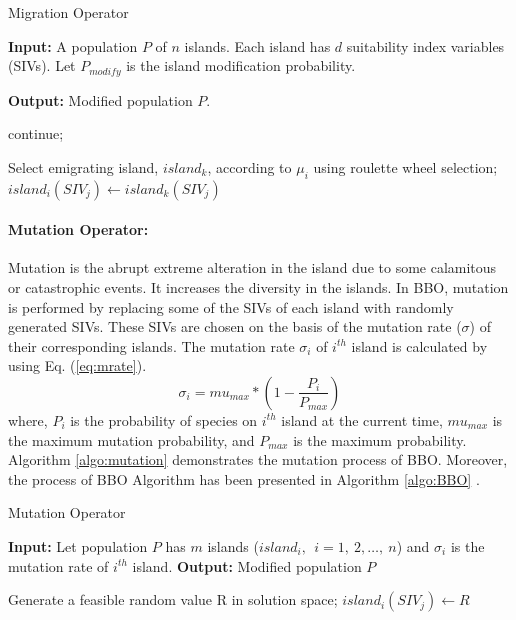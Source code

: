 \begin{algorithm}
\footnotesize
\caption{\fontsize{10pt}{12pt}\selectfont Migration Operator  \cite{ma2010}}
\label{algo:migration}
\begin{algorithmic}
\STATE \textbf{Input:}  A population $P$ of $n$ islands. Each island has $d$ suitability index variables (SIVs).
\STATE Let $P_{modify}$ is the island modification probability.

\STATE \textbf{Output:}  Modified population $P$.

    \STATE    continue;
  \ENDIF


        \STATE Select emigrating island, $island_k$, according to $\mu_i$ using roulette wheel selection;
           \STATE  $island_i(SIV_j) \leftarrow island_k(SIV_j)$
         
    \ENDIF
\ENDFOR
\ENDFOR
\end{algorithmic}
\end{algorithm}

\paragraph{Mutation Operator:} Mutation is the abrupt extreme alteration in the island due to some calamitous or catastrophic events. It increases the diversity in the islands. In BBO, mutation is performed by replacing some of the SIVs of each island with randomly generated SIVs. These SIVs are chosen on the basis of the mutation rate ($\sigma$) of their corresponding islands. The mutation rate $\sigma_i$ of $i^{th}$ island is calculated by using Eq. (\ref{eq:mrate}).
\begin{equation}\label{eq:mrate}
\sigma_i=mu_{max}*(1-\frac{P_i}{P_{max}} )
\end{equation}
where, ${P_i}$  is the probability of species on $i^{th}$ island at the current time, $mu_{max}$ is the maximum mutation probability, and $P_{max}$  is the maximum probability.  Algorithm \ref{algo:mutation} \cite{ma2010} demonstrates the mutation process of BBO. Moreover, the process of BBO Algorithm has been presented in Algorithm \ref{algo:BBO} \cite{ma2010}.

\begin{algorithm}
\caption{\fontsize{10}{12} \selectfont Mutation Operator \cite{ma2010}}
\label{algo:mutation}
\footnotesize

\begin{algorithmic}
\STATE \textbf{Input:} Let population $P$ has $m$ islands ($island_i,\ \ i=1,\ 2,\dots, \ n$) and $\sigma_i$ is the mutation rate of $i^{th}$ island.
\STATE \textbf{Output:} Modified population $P$

        \STATE Generate a feasible random value R in solution space;
        \STATE $island_i (SIV_j) \leftarrow R$
    \ENDIF
    \ENDFOR
\ENDFOR
\end{algorithmic}
\end{algorithm}

